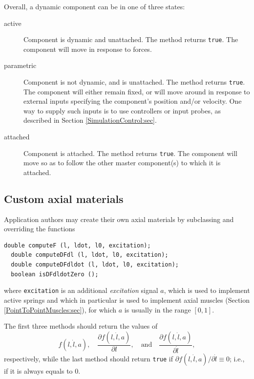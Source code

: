 Overall, a dynamic component can be in one of three states:

\begin{description}

\item[active]\mbox{}

Component is dynamic and unattached. The method
returns {\tt true}. The component will move in response to forces.

\item[parametric]\mbox{}

Component is not dynamic, and is unattached. 
The method
returns {\tt true}.
The component will either remain
fixed, or will move around in response to external inputs specifying
the component's position and/or velocity. One way to supply such
inputs is to use controllers or input probes, as described in
Section \ref{SimulationControl:sec}.

\item[attached]\mbox{}

Component is attached. The method
returns {\tt true}. The component will move so as to follow the other
master component(s) to which it is attached.

\end{description}

\subsection{Custom axial materials}
\label{CustomAxialMaterials:sec}

Application authors may create their
own axial materials by subclassing 
and overriding the functions
\begin{lstlisting}[]
  double computeF (l, ldot, l0, excitation);
  double computeDFdl (l, ldot, l0, excitation);
  double computeDFdldot (l, ldot, l0, excitation);
  boolean isDFdldotZero ();
\end{lstlisting}
%
where {\tt excitation} is an additional {\it excitation} signal $a$, which
is used to implement active springs and which in particular is used to
implement axial muscles (Section \ref{PointToPointMuscles:sec}), for
which $a$ is usually in the range $[0, 1]$.

The first three methods should return the values of 
%
\begin{equation}
f (l, \dot l, a), \quad
\frac{\partial f(l, \dot l, a)}{\partial l}, \quad \text{and} \quad
\frac{\partial f(l, \dot l, a)}{\partial \dot l},
\end{equation}
%
respectively, while the last method should return {\tt true} if
$\partial f(l, \dot l, a) / \partial \dot l \equiv 0$; i.e., if it is
always equals to 0.

